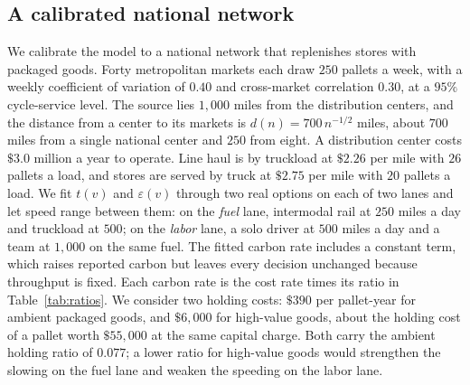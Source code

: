 \documentclass[11pt]{article}
\theoremstyle{definition}
\theoremstyle{remark}
\theoremstyle{plain}
\begin{document}
\subsection{A calibrated national network}\label{sec:network}

We calibrate the model to a national network that replenishes stores with packaged goods. Forty metropolitan
markets each draw $250$ pallets a week, with a weekly coefficient of variation of $0.40$ and cross-market
correlation $0.30$, at a $95\%$ cycle-service level. The source lies $1{,}000$ miles from the distribution
centers, and the distance from a center to its markets is $d(n)=700\,n^{-1/2}$ miles, about $700$ miles from a
single national center and $250$ from eight. A distribution center costs $\$3.0$ million a year to operate.
Line haul is by truckload at $\$2.26$ per mile with $26$ pallets a load, and stores are served by truck at
$\$2.75$ per mile with $20$ pallets a load. We fit $t(v)$ and $\varepsilon(v)$ through two real options on
each of two lanes and let speed range between them: on the \emph{fuel} lane, intermodal rail at $250$ miles a
day and truckload at $500$; on the \emph{labor} lane, a solo driver at $500$ miles a day and a team at $1{,}000$
on the same fuel. The fitted carbon rate includes a constant term, which raises reported carbon but leaves
every decision unchanged because throughput is fixed. Each carbon rate is the cost rate times its ratio in
Table~\ref{tab:ratios}. We consider two holding costs: $\$390$ per pallet-year for ambient packaged goods, and
$\$6{,}000$ for high-value goods, about the holding cost of a pallet worth $\$55{,}000$ at the same capital
charge. Both carry the ambient holding ratio of $0.077$; a lower ratio for high-value goods would strengthen
the slowing on the fuel lane and weaken the speeding on the labor lane.
\end{document}
